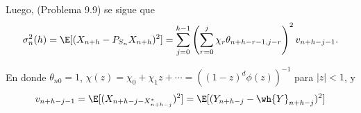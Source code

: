 Luego, (Problema 9.9) se sigue que
\[ \sigma_n^2(h) = \E[(X_{n+h} - P_{S_n} X_{n+h})^2] = \sum_{j = 0}^{h-1} \left( \sum_{r = 0}^j \chi_r \theta_{n+h-r-1,j-r} \right)^2 v_{n+h-j-1}. \]

En donde $\theta_{n0} = 1$, $\chi(z) = \chi_0 + \chi_1 z + \cdots = ((1-z)^d \phi(z))^{-1}$ para $|z| < 1$, y
\[ v_{n+h-j-1} = \E[(X_{n+h-j - X_{n+h-j}^*})^2] = \E[(Y_{n+h-j} - \wh{Y}_{n+h-j})^2] \]

